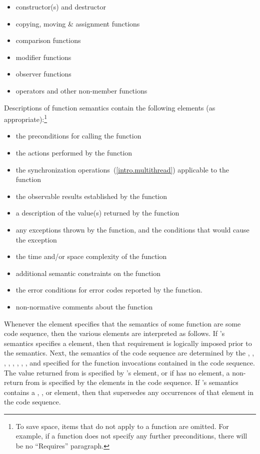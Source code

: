 \begin{itemize}
\item constructor(s) and destructor
\item copying, moving \& assignment functions
\item comparison functions
\item modifier functions
\item observer functions
\item operators and other non-member functions
\end{itemize}

\pnum
Descriptions of function semantics contain the following elements (as
appropriate):\footnote{To save space, items that do not apply to a function are omitted.
For example, if a function does not specify any
further
preconditions, there will be no ``Requires'' paragraph.}

\begin{itemize}
\item \requires the preconditions for calling the function
\item \effects the actions performed by the function
\item \sync the synchronization operations~(\ref{intro.multithread}) applicable to the function
\item \postconditions the observable results established by the function
\item \returns a description of the value(s) returned by the function
\item \throws any exceptions thrown by the function, and the conditions that would cause the exception
\item \complexity the time and/or space complexity of the function
\item \notes additional semantic constraints on the function
\item \errors the error conditions for error codes reported by the function.
\item \realnotes non-normative comments about the function
\end{itemize}

\pnum
Whenever the \effects element specifies that the semantics of some function
 are  some code sequence, then the various elements are
interpreted as follows. If 's semantics specifies a \requires element, then
that requirement is logically imposed prior to the  semantics.
Next, the semantics of the code sequence are determined by the \requires, \effects,
\postconditions, \returns, \throws, \complexity, \notes, \errors, and \realnotes
specified for the function invocations contained in the code sequence. The value
returned from  is specified by 's \returns element, or if 
has no \returns element, a non- return from  is specified by the
\returns elements in the code sequence. If 's semantics contains a \throws,
\postconditions, or \complexity element, then that supersedes any occurrences of that
element in the code sequence.

